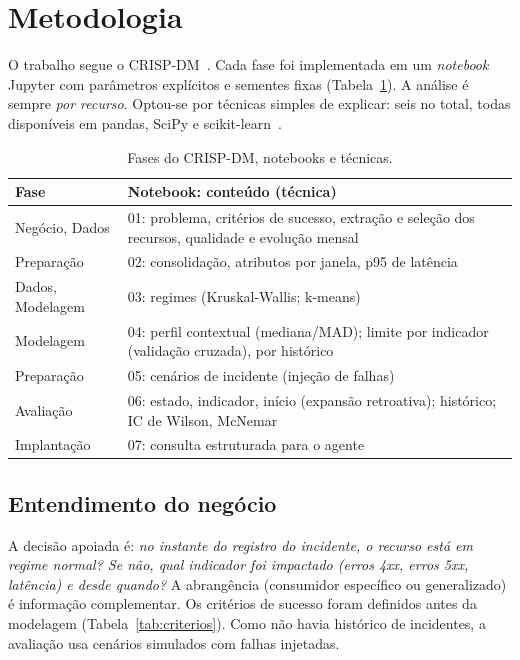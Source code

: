 \documentclass[sigconf,nonacm]{acmart}
\begin{document}
\section{Metodologia}\label{sec:metodologia}

O trabalho segue o CRISP-DM~\citep{wirth2000crispdm,chapman2000crispdm}. Cada fase foi implementada em um \emph{notebook} Jupyter com parâmetros explícitos e sementes fixas (Tabela~\ref{tab:fases}). A análise é sempre \emph{por recurso}. Optou-se por técnicas simples de explicar: seis no total, todas disponíveis em pandas, SciPy e scikit-learn~\citep{pedregosa2011sklearn}.

\begin{table}[t]
  \caption{Fases do CRISP-DM, notebooks e técnicas.}
  \label{tab:fases}
  \small
  \begin{tabular}{p{}p{}}
    \toprule
    Fase & Notebook: conteúdo (técnica) \\
    \midrule
    Negócio, Dados & 01: problema, critérios de sucesso, extração e seleção dos recursos, qualidade e evolução mensal \\
    Preparação & 02: consolidação, atributos por janela, p95 de latência \\
    Dados, Modelagem & 03: regimes (Kruskal-Wallis; k-means) \\
    Modelagem & 04: perfil contextual (mediana/MAD); limite por indicador (validação cruzada), por histórico \\
    Preparação & 05: cenários de incidente (injeção de falhas) \\
    Avaliação & 06: estado, indicador, início (expansão retroativa); histórico; IC de Wilson, McNemar \\
    Implantação & 07: consulta estruturada para o agente \\
    \bottomrule
  \end{tabular}
\end{table}

\subsection{Entendimento do negócio}
A decisão apoiada é: \emph{no instante do registro do incidente, o recurso está em regime normal? Se não, qual indicador foi impactado (erros 4xx, erros 5xx, latência) e desde quando?} A abrangência (consumidor específico ou generalizado) é informação complementar. Os critérios de sucesso foram definidos antes da modelagem (Tabela~\ref{tab:criterios}). Como não havia histórico de incidentes, a avaliação usa cenários simulados com falhas injetadas.
\end{document}
